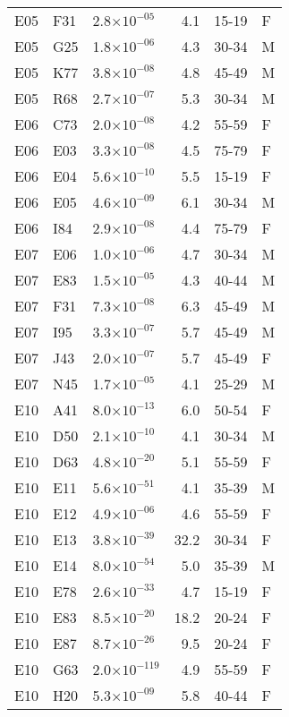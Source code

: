 \begin{longtable}{lllrll}
   E05 & F31 & 2.8$\times10^{-05}$ & 4.1 & 15-19 & F \\ 
   E05 & G25 & 1.8$\times10^{-06}$ & 4.3 & 30-34 & M \\ 
   E05 & K77 & 3.8$\times10^{-08}$ & 4.8 & 45-49 & M \\ 
   E05 & R68 & 2.7$\times10^{-07}$ & 5.3 & 30-34 & M \\ 
   E06 & C73 & 2.0$\times10^{-08}$ & 4.2 & 55-59 & F \\ 
   E06 & E03 & 3.3$\times10^{-08}$ & 4.5 & 75-79 & F \\ 
   E06 & E04 & 5.6$\times10^{-10}$ & 5.5 & 15-19 & F \\ 
   E06 & E05 & 4.6$\times10^{-09}$ & 6.1 & 30-34 & M \\ 
   E06 & I84 & 2.9$\times10^{-08}$ & 4.4 & 75-79 & F \\ 
   E07 & E06 & 1.0$\times10^{-06}$ & 4.7 & 30-34 & M \\ 
   E07 & E83 & 1.5$\times10^{-05}$ & 4.3 & 40-44 & M \\ 
   E07 & F31 & 7.3$\times10^{-08}$ & 6.3 & 45-49 & M \\ 
   E07 & I95 & 3.3$\times10^{-07}$ & 5.7 & 45-49 & M \\ 
   E07 & J43 & 2.0$\times10^{-07}$ & 5.7 & 45-49 & F \\ 
   E07 & N45 & 1.7$\times10^{-05}$ & 4.1 & 25-29 & M \\ 
   E10 & A41 & 8.0$\times10^{-13}$ & 6.0 & 50-54 & F \\ 
   E10 & D50 & 2.1$\times10^{-10}$ & 4.1 & 30-34 & M \\ 
   E10 & D63 & 4.8$\times10^{-20}$ & 5.1 & 55-59 & F \\ 
   E10 & E11 & 5.6$\times10^{-51}$ & 4.1 & 35-39 & M \\ 
   E10 & E12 & 4.9$\times10^{-06}$ & 4.6 & 55-59 & F \\ 
   E10 & E13 & 3.8$\times10^{-39}$ & 32.2 & 30-34 & F \\ 
   E10 & E14 & 8.0$\times10^{-54}$ & 5.0 & 35-39 & M \\ 
   E10 & E78 & 2.6$\times10^{-33}$ & 4.7 & 15-19 & F \\ 
   E10 & E83 & 8.5$\times10^{-20}$ & 18.2 & 20-24 & F \\ 
   E10 & E87 & 8.7$\times10^{-26}$ & 9.5 & 20-24 & F \\ 
   E10 & G63 & 2.0$\times10^{-119}$ & 4.9 & 55-59 & F \\ 
   E10 & H20 & 5.3$\times10^{-09}$ & 5.8 & 40-44 & F \\ 

\end{longtable}
